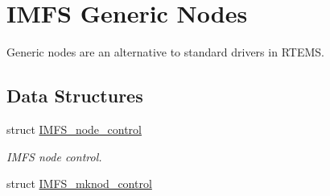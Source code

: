 \hypertarget{group__IMFSGenericNodes}{}\section{I\+M\+FS Generic Nodes}
\label{group__IMFSGenericNodes}


Generic nodes are an alternative to standard drivers in R\+T\+E\+MS.  


\subsection*{Data Structures}
\begin{DoxyCompactItemize}
\item 
struct \mbox{\hyperlink{structIMFS__node__control}{I\+M\+F\+S\+\_\+node\+\_\+control}}
\begin{DoxyCompactList}\small\item\em I\+M\+FS node control. \end{DoxyCompactList}\item 
struct \mbox{\hyperlink{structIMFS__mknod__control}{I\+M\+F\+S\+\_\+mknod\+\_\+control}}
\end{DoxyCompactItemize}
